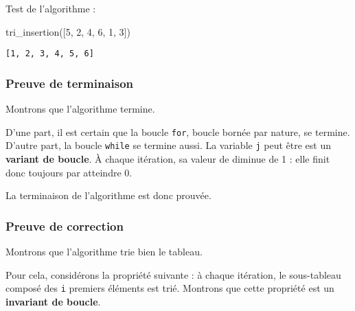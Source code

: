 \documentclass[
  a4paper,
  DIV=11,
  numbers=noendperiod]{scrartcl}
\newenvironment{Shaded}{\begin{snugshade}}{\end{snugshade}}
\newcommand{\DecValTok}[1]{\textcolor[rgb]{0.68,0.00,0.00}{#1}}
\newcommand{\NormalTok}[1]{\textcolor[rgb]{0.00,0.23,0.31}{#1}}
\begin{document}
Test de l'algorithme :

\begin{Shaded}
\begin{Highlighting}[]
\NormalTok{tri\_insertion([}\DecValTok{5}\NormalTok{, }\DecValTok{2}\NormalTok{, }\DecValTok{4}\NormalTok{, }\DecValTok{6}\NormalTok{, }\DecValTok{1}\NormalTok{, }\DecValTok{3}\NormalTok{])}
\end{Highlighting}
\end{Shaded}

\begin{verbatim}
[1, 2, 3, 4, 5, 6]
\end{verbatim}

\hypertarget{preuve-de-terminaison}{%
\subsubsection{Preuve de terminaison}\label{preuve-de-terminaison}}

Montrons que l'algorithme termine.

D'une part, il est certain que la boucle \texttt{for}, boucle bornée par
nature, se termine. D'autre part, la boucle \texttt{while} se termine
aussi. La variable \texttt{j} peut être est un \textbf{variant de
boucle}. À chaque itération, sa valeur de diminue de 1 : elle finit donc
toujours par atteindre 0.

La terminaison de l'algorithme est donc prouvée.

\hypertarget{preuve-de-correction}{%
\subsubsection{Preuve de correction}\label{preuve-de-correction}}

Montrons que l'algorithme trie bien le tableau.

Pour cela, considérons la propriété suivante : à chaque itération, le
sous-tableau composé des \texttt{i} premiers éléments est trié. Montrons
que cette propriété est un \textbf{invariant de boucle}.
\end{document}
